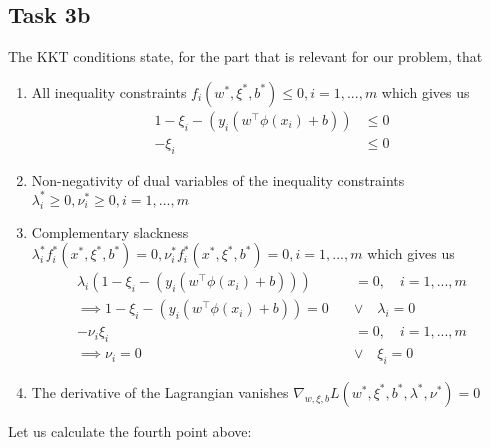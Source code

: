 \documentclass{article}
\begin{document}
	\subsection*{Task 3b}
		The KKT conditions state, for the part that is relevant for our problem, that 
		\begin{enumerate}
			\item All inequality constraints $f_i(w^*, \xi^*,  b^*)\leq 0, i = 1,...,m$ which gives us
			\begin{align}
				1- \xi_i - (y_i(w^\top \phi(x_i) +b)) &\leq 0 \\
				-\xi_i &\leq 0
			\end{align}
			\item Non-negativity of dual variables of the inequality constraints $\lambda_i^* \geq 0, \nu_i^* \geq 0, i = 1,...,m$
			
			\item Complementary slackness $\lambda_i^* f_i^*(x^*,\xi^*, b^*) = 0 , \nu_i^*f_i^*(x^*,\xi^*, b^*) = 0 , i = 1,...,m$
			which gives us
			\begin{align}
				\lambda_i(1- \xi_i - (y_i(w^\top \phi(x_i) +b))) &= 0 ,\quad i=1,...,m \\
				\implies 1- \xi_i - (y_i(w^\top \phi(x_i) +b)) = 0 \quad & \lor \quad  \lambda_i = 0 \\
				-\nu_i\xi_i &= 0,\quad i=1,...,m \\
				\implies \nu_i = 0 \quad & \lor \quad \xi_i=0
			\end{align}
			\item The derivative of the Lagrangian vanishes $\nabla_{w,\xi,b}L(w^*,\xi^*,b^*,\lambda^*, \nu^*) = 0$
		\end{enumerate}
		Let us calculate the fourth point above:
\end{document}
